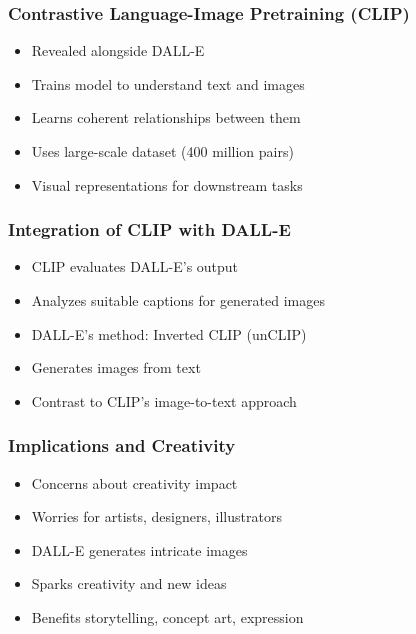 \begin{frame}[fragile]\frametitle{Contrastive Language-Image Pretraining (CLIP)}
    
    \begin{itemize}
        \item Revealed alongside DALL-E
        \item Trains model to understand text and images
        \item Learns coherent relationships between them
        \item Uses large-scale dataset (400 million pairs)
        \item Visual representations for downstream tasks
    \end{itemize}
\end{frame}

\begin{frame}[fragile]\frametitle{Integration of CLIP with DALL-E}
    
    \begin{itemize}
        \item CLIP evaluates DALL-E's output
        \item Analyzes suitable captions for generated images
        \item DALL-E's method: Inverted CLIP (unCLIP)
        \item Generates images from text
        \item Contrast to CLIP's image-to-text approach
    \end{itemize}
\end{frame}

\begin{frame}[fragile]\frametitle{Implications and Creativity}
    
    \begin{itemize}
        \item Concerns about creativity impact
        \item Worries for artists, designers, illustrators
        \item DALL-E generates intricate images
        \item Sparks creativity and new ideas
        \item Benefits storytelling, concept art, expression
    \end{itemize}
\end{frame}


